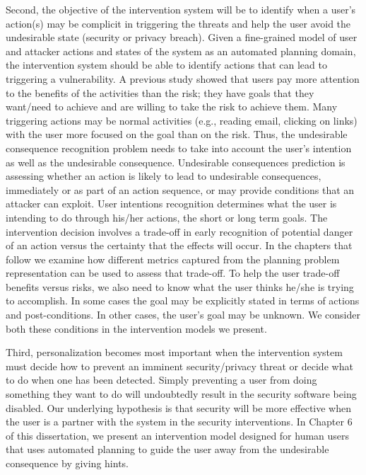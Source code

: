 Second, the objective of the intervention system will be to identify when a user's action(s) may be complicit in triggering the threats and help the user avoid the undesirable state (security or privacy breach).
Given a fine-grained model of user and attacker actions and states of the system as an automated planning domain, the intervention system should be able to identify actions that can lead to triggering a vulnerability.
A previous study \cite{byrne2016} showed that users pay more attention to the benefits of the activities than the risk; they have goals that they want/need to achieve and are willing to take the risk to achieve them. 
Many triggering actions may be normal activities (e.g., reading email, clicking on links)
with the user more focused on the goal than on the risk.
Thus, the undesirable consequence recognition problem needs to take into account the user's intention as well as the undesirable consequence.
Undesirable consequences prediction is assessing whether an action is likely to lead to undesirable consequences, immediately or as part of an action sequence, or may provide conditions
that an attacker can exploit. 
User intentions recognition determines what the user is intending to do through his/her actions, the short or long term goals.
The intervention decision involves a trade-off in early recognition of potential danger of an action versus the certainty that the effects will occur. In the chapters that follow we examine how different metrics captured from the planning problem representation can be used to assess that trade-off.
To help the user trade-off benefits versus risks, we also need to know what the user thinks he/she
is trying to accomplish. In some cases the goal may be explicitly stated in terms of actions and post-conditions. In other cases, the user's goal may be unknown. We consider both these conditions in the intervention models we present.


Third, personalization becomes most important when the intervention system must decide how to prevent an imminent security/privacy threat or decide what to do when one has been detected. Simply preventing a user from doing something they want to do will undoubtedly result in the security software being disabled. 
Our underlying hypothesis is that security will be more effective when the user is a partner with the system in the security interventions. In Chapter 6 of this dissertation, we present an intervention model designed for human users that uses automated planning to guide the user away from the undesirable consequence by giving hints.



